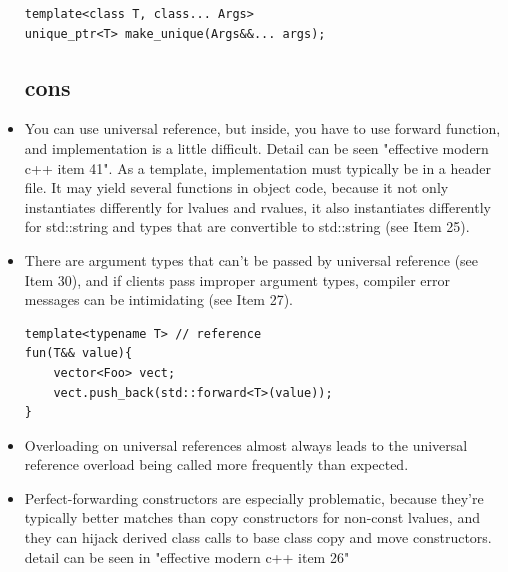 \documentclass[a4paper,11pt,twoside]{book}
\begin{document}
\begin{itemize}
\begin{lstlisting}[numbers=none]
template<class T, class... Args> 
unique_ptr<T> make_unique(Args&&... args); 
\end{lstlisting}

\subsection{cons}

\item You can use universal reference,  but inside, you have to use forward function, and implementation is a little difficult.  Detail can be seen "effective modern c++ item 41". As a template, implementation must typically be in a header file. It may yield several functions in object code, because it not only instantiates differently for lvalues and rvalues, it also instantiates differently for std::string and types that are convertible to std::string (see Item 25). 

\item There are argument types that can't be passed by universal reference (see Item 30), and if clients pass improper argument types, compiler error messages can be intimidating (see Item 27).

\begin{lstlisting}[numbers=none]
template<typename T> // reference
fun(T&& value){
	vector<Foo> vect;
	vect.push_back(std::forward<T>(value)); 
}
\end{lstlisting}


\item Overloading on universal references almost always leads to the universal reference overload being called more frequently than expected.

\item Perfect-forwarding constructors are especially problematic, because they're typically better matches than copy constructors for non-const lvalues, and they can hijack derived class calls to base class copy and move constructors. detail can be seen in "effective modern c++ item 26"

\end{itemize}
\end{document}

